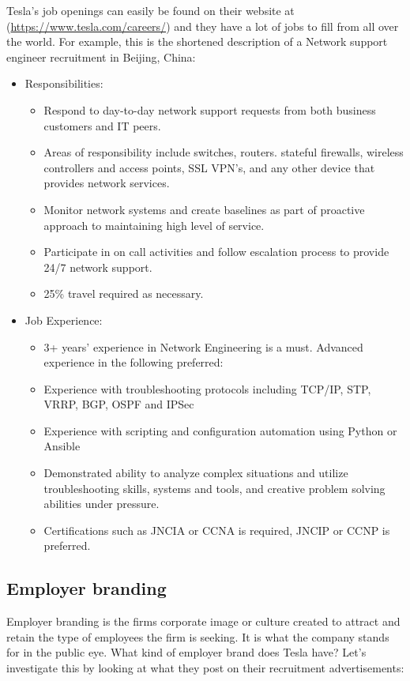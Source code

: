\documentclass[12pt]{article}
\begin{document}
Tesla's job openings can easily be found on their website at (\url{https://www.tesla.com/careers/}) and they have a lot of jobs to fill from all over the world. For example, this is the shortened description of a Network support engineer recruitment in Beijing, China:
{\itshape
\begin{itemize}
	\item{Responsibilities:}
	\begin{itemize}
		\item{Respond to day-to-day network support requests from both business customers and IT peers.}
		\item{Areas of responsibility include switches, routers. stateful firewalls, wireless controllers and access points, SSL VPN’s, and any other device that provides network services.}
		\item{Monitor network systems and create baselines as part of proactive approach to maintaining high level of service.}
		\item{Participate in on call activities and follow escalation process to provide 24/7 network support.}
		\item{25\% travel required as necessary.}
	\end{itemize}
	\item{Job Experience:}
	\begin{itemize}
		\item{3+ years’ experience in Network Engineering is a must. Advanced experience in the following preferred:}
		\item{Experience with troubleshooting protocols including TCP/IP, STP, VRRP, BGP, OSPF and IPSec}
		\item{Experience with scripting and configuration automation using Python or Ansible}
		\item{Demonstrated ability to analyze complex situations and utilize troubleshooting skills, systems and tools, and creative problem solving abilities under pressure.}
		\item{Certifications such as JNCIA or CCNA is required, JNCIP or CCNP is preferred.}
	\end{itemize}
\end{itemize}
}

\subsection{Employer branding}

Employer branding is the firms corporate image or culture created to attract and retain the type of employees the firm is seeking. It is what the company stands for in the public eye. What kind of employer brand does Tesla have? Let's investigate this by looking at what they post on their recruitment advertisements:
\end{document}
